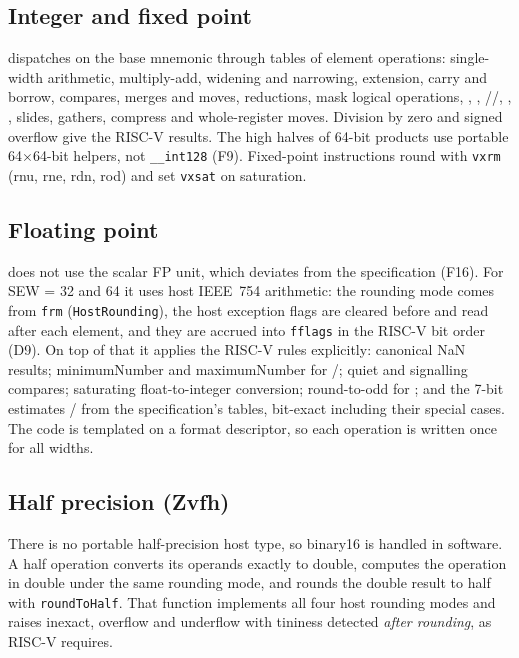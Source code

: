 \documentclass[11pt]{article}
\begin{document}
\subsection{Integer and fixed point}
 dispatches on the base mnemonic through tables of element
operations: single-width arithmetic, multiply-add, widening and narrowing, extension, carry and
borrow, compares, merges and moves, reductions, mask logical operations, ,
, //, , , slides,
gathers, compress and whole-register moves. Division by zero and signed overflow give the
RISC-V results. The high halves of 64-bit products use portable 64$\times$64-bit helpers, not
\texttt{\_\_int128} (F9). Fixed-point instructions round with \texttt{vxrm} (rnu, rne, rdn,
rod) and set \texttt{vxsat} on saturation.

\subsection{Floating point}
 does not use the scalar FP unit, which deviates from the
specification (F16). For SEW = 32 and 64 it uses host IEEE~754 arithmetic: the rounding mode comes
from \texttt{frm} (\texttt{HostRounding}), the host exception flags are cleared before and read
after each element, and they are accrued into \texttt{fflags} in the RISC-V bit order (D9). On
top of that it applies the RISC-V rules explicitly: canonical NaN results; minimumNumber and
maximumNumber for /; quiet and signalling compares; saturating
float-to-integer conversion; round-to-odd for ; and the 7-bit estimates
/ from the specification's tables, bit-exact including their special
cases. The code is templated on a format descriptor, so each operation is written once for all
widths.

\subsection{Half precision (Zvfh)}\label{sec:half}
There is no portable half-precision host type, so binary16 is handled in software. A half
operation converts its operands exactly to double, computes the operation in double under the
same rounding mode, and rounds the double result to half with \texttt{roundToHalf}. That
function implements all four host rounding modes and raises inexact, overflow and underflow with
tininess detected \emph{after rounding}, as RISC-V requires.
\end{document}

